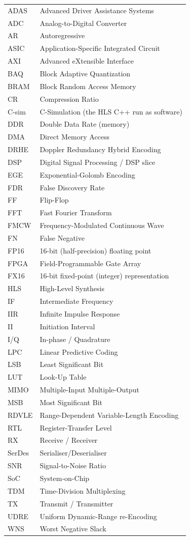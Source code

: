 \begin{longtable}{@{}p{28mm}p{110mm}@{}}
ADAS   & Advanced Driver Assistance Systems\\
ADC    & Analog-to-Digital Converter\\
AR     & Autoregressive\\
ASIC   & Application-Specific Integrated Circuit\\
AXI    & Advanced eXtensible Interface\\
BAQ    & Block Adaptive Quantization\\
BRAM   & Block Random Access Memory\\
CR     & Compression Ratio\\
C-sim  & C-Simulation (the HLS C++ run as software)\\
DDR    & Double Data Rate (memory)\\
DMA    & Direct Memory Access\\
DRHE   & Doppler Redundancy Hybrid Encoding\\
DSP    & Digital Signal Processing / DSP slice\\
EGE    & Exponential-Golomb Encoding\\
FDR    & False Discovery Rate\\
FF     & Flip-Flop\\
FFT    & Fast Fourier Transform\\
FMCW   & Frequency-Modulated Continuous Wave\\
FN     & False Negative\\
FP16   & 16-bit (half-precision) floating point\\
FPGA   & Field-Programmable Gate Array\\
FX16   & 16-bit fixed-point (integer) representation\\
HLS    & High-Level Synthesis\\
IF     & Intermediate Frequency\\
IIR    & Infinite Impulse Response\\
II     & Initiation Interval\\
I/Q    & In-phase / Quadrature\\
LPC    & Linear Predictive Coding\\
LSB    & Least Significant Bit\\
LUT    & Look-Up Table\\
MIMO   & Multiple-Input Multiple-Output\\
MSB    & Most Significant Bit\\
RDVLE  & Range-Dependent Variable-Length Encoding\\
RTL    & Register-Transfer Level\\
RX     & Receive / Receiver\\
SerDes & Serialiser/Deserialiser\\
SNR    & Signal-to-Noise Ratio\\
SoC    & System-on-Chip\\
TDM    & Time-Division Multiplexing\\
TX     & Transmit / Transmitter\\
UDRE   & Uniform Dynamic-Range re-Encoding\\
WNS    & Worst Negative Slack\\
\end{longtable}
